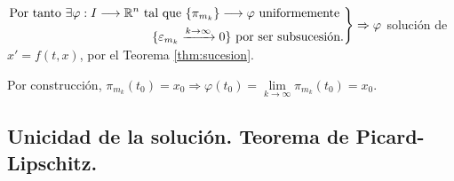\documentclass[11pt]{article}
\makeatletter
\theoremstyle{theorem-style}  %
\renewenvironment{proof}[1][\proofname]{\par
	\pushQED{\qed}%
	\normalfont \topsep6\p@\@plus6\p@\relax
	\list{}{%
		\settowidth{\leftmargin}{\quad:\hskip\labelsep}%
		\setlength{\labelwidth}{0pt}%
		\setlength{\itemindent}{-\leftmargin}%
	}%
	\item[\hskip\labelsep\itshape#1\@addpunct{:}]\ignorespaces
}{%
	\popQED\endlist\@endpefalse
}
\theoremstyle{definition-style}
\theoremstyle{example-style}
\newenvironment{rcases}
{\left.\begin{aligned}}
	{\end{aligned}\right\rbrace}
\makeatother
\begin{document}
\begin{proof}
	$ \begin{rcases}
		\text{Por tanto } \exists \varphi: I\longrightarrow \mathbb{R}^n \text{ tal que } \{\pi_{m_k} \}\longrightarrow \varphi \text{ uniformemente }\\
		\{\varepsilon_{m_k}\xrightarrow{k\to \infty}0  \} \text{ por ser subsucesión.}
	\end{rcases} \Rightarrow \varphi$ solución de $ x'=f(t,x) $, por el Teorema \ref{thm:sucesion}.
	
	Por construcción, $ \pi_{m_k}(t_0)=x_0 \Rightarrow \varphi(t_0) = \lim\limits_{k\to \infty}\pi_{m_k}(t_0)=x_0$.
\end{proof}

\subsection{Unicidad de la solución. Teorema de Picard-Lipschitz.}
\end{document}
